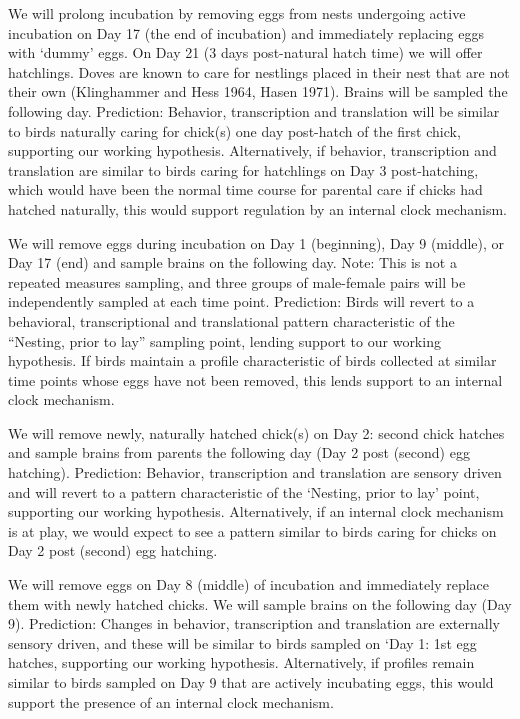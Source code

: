 \documentclass[10pt,letterpaper]{article}
\begin{document}
We will prolong incubation by removing eggs from nests undergoing active
incubation on Day 17 (the end of incubation) and immediately replacing
eggs with `dummy' eggs. On Day 21 (3 days post-natural hatch time) we
will offer hatchlings. Doves are known to care for nestlings placed in
their nest that are not their own (Klinghammer and Hess 1964, Hasen
1971). Brains will be sampled the following day. Prediction: Behavior,
transcription and translation will be similar to birds naturally caring
for chick(s) one day post-hatch of the first chick, supporting our
working hypothesis. Alternatively, if behavior, transcription and
translation are similar to birds caring for hatchlings on Day 3
post-hatching, which would have been the normal time course for parental
care if chicks had hatched naturally, this would support regulation by
an internal clock mechanism.

We will remove eggs during incubation on Day 1 (beginning), Day 9
(middle), or Day 17 (end) and sample brains on the following day. Note:
This is not a repeated measures sampling, and three groups of
male-female pairs will be independently sampled at each time point.
Prediction: Birds will revert to a behavioral, transcriptional and
translational pattern characteristic of the ``Nesting, prior to lay''
sampling point, lending support to our working hypothesis. If birds
maintain a profile characteristic of birds collected at similar time
points whose eggs have not been removed, this lends support to an
internal clock mechanism.

We will remove newly, naturally hatched chick(s) on Day 2: second chick
hatches and sample brains from parents the following day (Day 2 post
(second) egg hatching). Prediction: Behavior, transcription and
translation are sensory driven and will revert to a pattern
characteristic of the `Nesting, prior to lay' point, supporting our
working hypothesis. Alternatively, if an internal clock mechanism is at
play, we would expect to see a pattern similar to birds caring for
chicks on Day 2 post (second) egg hatching.

We will remove eggs on Day 8 (middle) of incubation and immediately
replace them with newly hatched chicks. We will sample brains on the
following day (Day 9). Prediction: Changes in behavior, transcription
and translation are externally sensory driven, and these will be similar
to birds sampled on `Day 1: 1st egg hatches, supporting our working
hypothesis. Alternatively, if profiles remain similar to birds sampled
on Day 9 that are actively incubating eggs, this would support the
presence of an internal clock mechanism.
\end{document}
